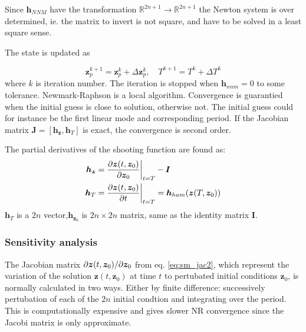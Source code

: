Since $\bm h_{NNM}$ have the transformation $\mathbb{R}^{2n+1} \rightarrow
\mathbb{R}^{2n+1}$ the Newton system is over determined, ie. the matrix to
invert is not square, and have to be solved in a least square sense.

The state is updated as

\begin{equation}
  \label{eq:sm_nr_update}
  \bm z^{k+1}_{p} = \bm z^k_{p} + \Delta \bm z^k_{p}, \quad
  T^{k+1} = T^k + \Delta T^k
\end{equation}
where $k$ is iteration number. The iteration is stopped when $\bm h_{nnm} = 0$
to some tolerance. Newmark-Raphson is a local algorithm. Convergence is
guarantied when the initial guess is close to solution, otherwise not. The
initial guess could for instance be the first linear mode and corresponding
period. If the Jacobian matrix $\bm J = [\bm h_{\bm z}, \bm h_T] $ is exact, the
convergence is second order.


The partial derivatives of the shooting function are found as:
\begin{align}
  \label{eq:sm_jac1}
  \bm h_{\bm{z}}&=
  \frac{\partial \bm z(t, \bm z_0)}{\partial \bm z_0}\bigg|_{t=T} - \bm I \\
  \bm h_T &=
  \frac{\partial \bm z(t, \bm z_0)}{\partial t}\bigg|_{t=T} =
  \bm h_{ham}(\bm z(T, \bm z_0))
  \label{eq:sm_jac2}
\end{align}
$\bm h_{T}$ is a $2n$ vector,$\bm h_{\bm z_{0}}$ is $2n\times 2n$ matrix, same
as the identity matrix $\bm I$.



\subsubsection{Sensitivity analysis}
\label{sec:sm_sens_ana}

The Jacobian matrix $\partial \bm z(t,\bm z_0) / \partial \bm z_{0}$ from eq.
\eqref{eq:sm_jac2}, which represent the variation of the solution $\bm z(t,\bm
z_0)$ at time $t$ to pertubated initial conditions $\bm z_0$, is normally
calculated in two ways. Either by finite difference: successively pertubation of
each of the $2n$ initial condtion and integrating over the period. This is
computationally expensive and gives slower NR convergence since the Jacobi
matrix is only approximate.

